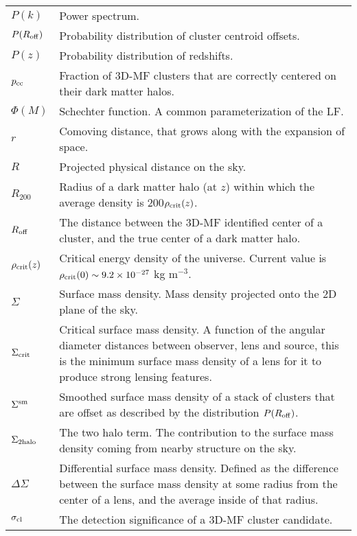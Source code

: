 \section*{\underline{}}
\vspace{-0.5cm}
\begin{tabular}{p{0.6in}p{5.8in}}

$P(k)$ & Power spectrum. \\
$P(R_{\rm off})$ & Probability distribution of cluster centroid offsets. \\
$P(z)$ & Probability distribution of redshifts. \\
$p_{\rm cc}$ & Fraction of \acs{3D-MF} clusters that are correctly centered on their dark matter halos. \\
$\Phi(M)$ & Schechter function. A common parameterization of the \acs{LF}. \\
$r$ & Comoving distance, that grows along with the expansion of space. \\
$R$ & Projected physical distance on the sky. \\
$R_{200}$ & Radius of a dark matter halo (at $z$) within which the average density is 200$\rho_{\rm crit}(z)$. \\
$R_{\rm off}$ & The distance between the \acs{3D-MF} identified center of a cluster, and the true center of a dark matter halo. \\
$\rho_{\rm crit}(z)$ & Critical energy density of the universe. Current value is $\rho_{\rm crit}(0) \sim 9.2 \times 10^{-27}$ kg m$^{-3}$. \\
$\Sigma$ & Surface mass density. Mass density projected onto the 2D plane of the sky. \\
$\Sigma_{\rm crit}$ & Critical surface mass density. A function of the angular diameter distances between observer, lens and source, this is the minimum surface mass density of a lens for it to produce strong lensing features. \\
$\Sigma^{\rm sm}$ & Smoothed surface mass density of a stack of clusters that are offset as described by the distribution $P(R_{\rm off})$. \\
$\Sigma_{\rm 2halo}$ & The two halo term. The contribution to the surface mass density coming from nearby structure on the sky. \\
$\Delta\Sigma$ & Differential surface mass density. Defined as the difference between the surface mass density at some radius from the center of a lens, and the average inside of that radius. \\
$\sigma_{\rm cl}$ & The detection significance of a \acs{3D-MF} cluster candidate. \\

\end{tabular}
